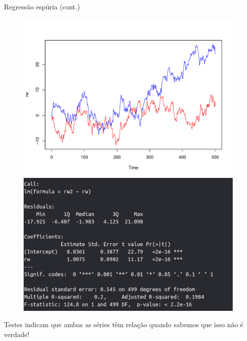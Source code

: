 \documentclass[11pt]{beamer}
\begin{document}
\begin{frame}{Regressão espúria (cont.)}
	\begin{figure}
		\includegraphics[scale=0.3]{graficos/espurio.pdf} 
		\includegraphics[scale=0.3]{graficos/reg.png} 
	\end{figure}
	Testes indicam que ambas as séries têm relação quando sabemos que isso não é verdade!
\end{frame}
\end{document}
